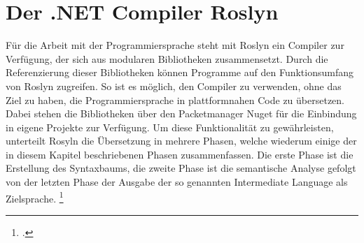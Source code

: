 \section{Der .NET Compiler Roslyn}
Für die Arbeit mit der Programmiersprache \Csharp{} steht mit Roslyn ein Compiler zur Verfügung, der sich aus modularen Bibliotheken zusammensetzt.  Durch die Referenzierung dieser Bibliotheken können Programme auf den Funktionsumfang von Roslyn zugreifen.  So ist es möglich, den Compiler zu verwenden, ohne das Ziel zu haben, die Programmiersprache \Csharp{} in plattformnahen Code zu übersetzen.  Dabei stehen die Bibliotheken über den Packetmanager Nuget für die Einbindung in eigene Projekte zur Verfügung.  Um diese Funktionalität zu gewährleisten,  unterteilt Rosyln die Übersetzung in mehrere Phasen,  welche wiederum einige der in diesem Kapitel beschriebenen Phasen zusammenfassen. Die erste Phase ist die Erstellung des Syntaxbaums, die zweite Phase ist die semantische Analyse gefolgt von der letzten Phase der Ausgabe der so genannten Intermediate Language als Zielsprache. \footcite[Vgl.][S. 1017]{Albahari2020}



